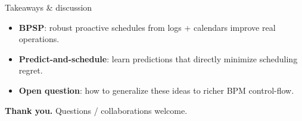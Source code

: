 \documentclass[aspectratio=169,10pt]{beamer}
\newif\ifshort
\newcommand{\btext}[1]{\textbf{\color{darkred}#1}}
\begin{document}
\ifshort
  \begin{frame}{Takeaways \& discussion}
    \begin{itemize}
      \item \btext{BPSP}: robust proactive schedules from logs + calendars improve real operations.
      \item \btext{Predict-and-schedule}: learn predictions that directly minimize scheduling regret.
      \item \btext{Open question}: how to generalize these ideas to richer BPM control-flow.
    \end{itemize}
    \vspace{0.35cm}
    \btext{Thank you.} \quad \small Questions / collaborations welcome.
  \end{frame}
  
\end{document}
